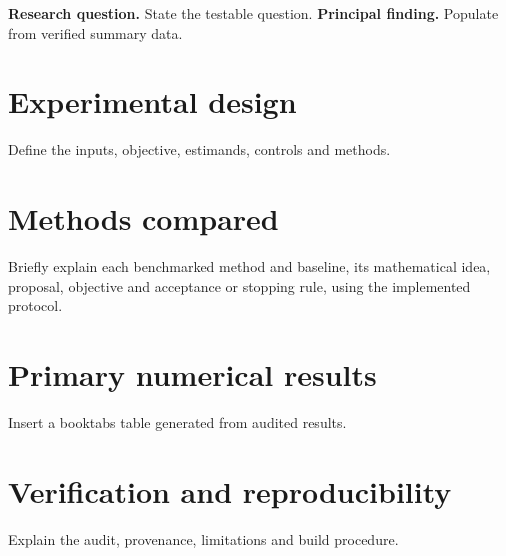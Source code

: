 \documentclass[11pt,a4paper]{article}
\begin{document}
\textbf{Research question.} State the testable question.
\textbf{Principal finding.} Populate from verified summary data.
\section{Experimental design}
Define the inputs, objective, estimands, controls and methods.
\section{Methods compared}
Briefly explain each benchmarked method and baseline, its mathematical idea, proposal, objective and acceptance or stopping rule, using the implemented protocol.\par
\section{Primary numerical results}
Insert a booktabs table generated from audited results.
\section{Verification and reproducibility}
Explain the audit, provenance, limitations and build procedure.
\end{document}
